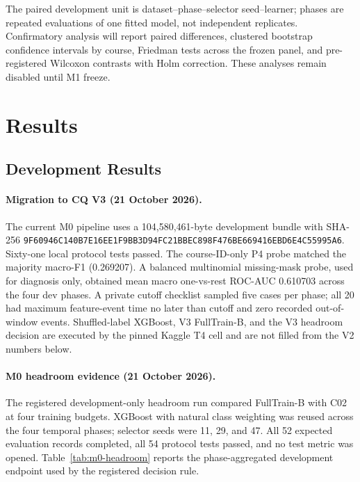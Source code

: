 \documentclass[runningheads]{llncs}
\begin{document}
The paired development unit is dataset--phase--selector seed--learner; phases
are repeated evaluations of one fitted model, not independent replicates.
Confirmatory analysis will report paired differences, clustered bootstrap
confidence intervals by course, Friedman tests across the frozen panel, and
pre-registered Wilcoxon contrasts with Holm correction.  These analyses remain
disabled until M1 freeze.

\section{Results}
\subsection{Development Results}
\paragraph{Migration to CQ V3 (21 October 2026).}
The current M0 pipeline uses a 104,580,461-byte development bundle with SHA-256
\nolinkurl{9F60946C140B7E16EE1F9BB3D94FC21BBEC898F476BE669416EBD6E4C55995A6}.
Sixty-one local protocol tests passed.  The course-ID-only P4 probe matched the
majority macro-F1 (0.269207).  A balanced multinomial missing-mask probe, used
for diagnosis only, obtained mean macro one-vs-rest ROC-AUC 0.610703 across the
four dev phases.  A private cutoff checklist sampled five cases per phase;
all 20 had maximum feature-event time no later than cutoff and zero recorded
out-of-window events.  Shuffled-label XGBoost, V3 FullTrain-B, and the V3
headroom decision are executed by the pinned Kaggle T4 cell and are not filled
from the V2 numbers below.

\paragraph{M0 headroom evidence (21 October 2026).}
The registered development-only headroom run compared FullTrain-B with C02 at
four training budgets.  XGBoost with natural class weighting was reused across
the four temporal phases; selector seeds were 11, 29, and 47.  All 52 expected
evaluation records completed, all 54 protocol tests passed, and no test metric
was opened.  Table~\ref{tab:m0-headroom} reports the phase-aggregated
development endpoint used by the registered decision rule.
\end{document}
